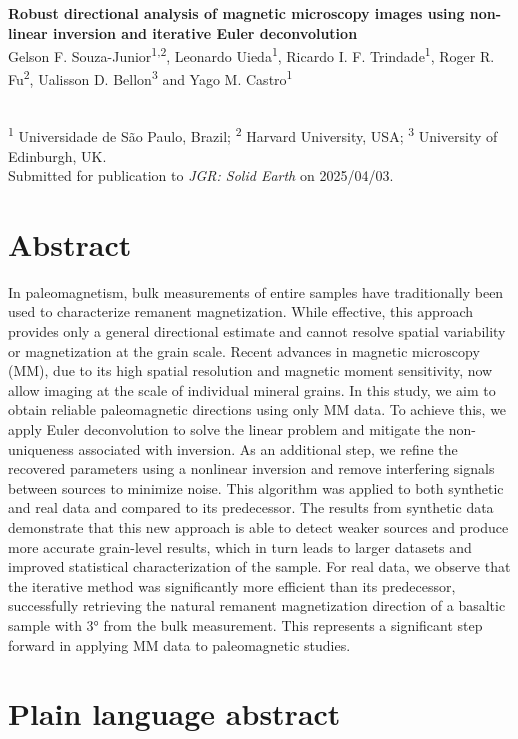 \documentclass[onecolumn,12pt,a4paper]{article}
\newcommand{\Title}{Robust directional analysis of magnetic microscopy images using non-linear inversion and iterative Euler deconvolution}
\newcommand{\SubmittedOn}{2025/04/03}
\newcommand{\Authors}{%
  Gelson F. Souza-Junior\textsuperscript{1,2},
  Leonardo Uieda\textsuperscript{1},
  Ricardo I. F. Trindade\textsuperscript{1},
  Roger R. Fu\textsuperscript{2},
  Ualisson D. Bellon\textsuperscript{3}
  and
  Yago M. Castro\textsuperscript{1}
}
\newcommand{\Affiliations}{%
  \textsuperscript{1} Universidade de São Paulo, Brazil;
  \textsuperscript{2} Harvard University, USA;
  \textsuperscript{3} University of Edinburgh, UK.
}
\newcommand{\Journal}{JGR: Solid Earth}
\begin{document}
\begin{FlushLeft}
    {\Large\bfseries \Title}
    \\[0.3cm]
    \Authors
    \\[0.3cm]
    {\Affiliations}
    \\[0.3cm]
    {Submitted for publication to \textit{\Journal{}} on \SubmittedOn.}
\end{FlushLeft}

\linenumbers

\section*{Abstract}

In paleomagnetism, bulk measurements of entire samples have traditionally been used to characterize remanent magnetization. While effective, this approach provides only a general directional estimate and cannot resolve spatial variability or magnetization at the grain scale. Recent advances in magnetic microscopy (MM), due to its high spatial resolution and magnetic moment sensitivity, now allow imaging at the scale of individual mineral grains. In this study, we aim to obtain reliable paleomagnetic directions using only MM data. To achieve this, we apply Euler deconvolution to solve the linear problem and mitigate the non-uniqueness associated with inversion. As an additional step, we refine the recovered parameters using a nonlinear inversion and remove interfering signals between sources to minimize noise. This algorithm was applied to both synthetic and real data and compared to its predecessor. The results from synthetic data demonstrate that this new approach is able to detect weaker sources and produce more accurate grain-level results, which in turn leads to larger datasets and improved statistical characterization of the sample. For real data, we observe that the iterative method was significantly more efficient than its predecessor, successfully retrieving the natural remanent magnetization direction of a basaltic sample with \ang{3} from the bulk measurement. This represents a significant step forward in applying MM data to paleomagnetic studies.

\section*{Plain language abstract}
\end{document}
